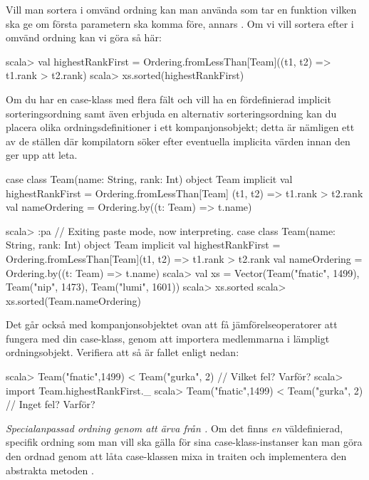 \Subtask Vill man sortera i omvänd ordning kan man använda 
 som tar en funktion  vilken ska ge  om första parametern ska komma före, annars . Om vi vill sortera efter  i omvänd ordning kan vi göra så här:
\begin{REPL}
scala> val highestRankFirst = 
         Ordering.fromLessThan[Team]((t1, t2) => t1.rank > t2.rank)
scala> xs.sorted(highestRankFirst)
\end{REPL}

\Subtask Om du har en case-klass med flera fält och vill ha en fördefinierad implicit sorteringsordning samt även erbjuda en alternativ sorteringsordning kan du placera olika ordningsdefinitioner i ett kompanjonsobjekt; detta är nämligen ett av de ställen där kompilatorn söker efter eventuella implicita värden innan den ger upp att leta. 
\begin{Code}
case class  Team(name: String, rank: Int)
object Team {
  implicit val highestRankFirst = Ordering.fromLessThan[Team]{
    (t1, t2) => t1.rank > t2.rank
  }
  val nameOrdering = Ordering.by((t: Team) => t.name)
}
\end{Code}
\begin{REPL}
scala> :pa
// Exiting paste mode, now interpreting.
case class  Team(name: String, rank: Int)
object Team {
  implicit val highestRankFirst = 
    Ordering.fromLessThan[Team]{(t1, t2) => t1.rank > t2.rank}
  val nameOrdering = Ordering.by((t: Team) => t.name)
}
scala> val xs = 
         Vector(Team("fnatic", 1499), Team("nip", 1473), Team("lumi", 1601))
scala> xs.sorted
scala> xs.sorted(Team.nameOrdering)
\end{REPL}



\Subtask Det går också med kompanjonsobjektet ovan att få jämförelseoperatorer att fungera med din case-klass, genom att importera medlemmarna i lämpligt ordningsobjekt. Verifiera att så är fallet enligt nedan:
\begin{REPL}
scala> Team("fnatic",1499) < Team("gurka", 2)  // Vilket fel? Varför?
scala> import Team.highestRankFirst._
scala> Team("fnatic",1499) < Team("gurka", 2)  // Inget fel? Varför?
\end{REPL}


\Task \emph{Specialanpassad ordning genom att ärva från .} Om det finns \emph{en} väldefinierad, specifik ordning som man vill ska gälla för sina case-klass-instanser kan man göra den ordnad genom att låta case-klassen mixa in traiten  och implementera den abstrakta metoden . 

